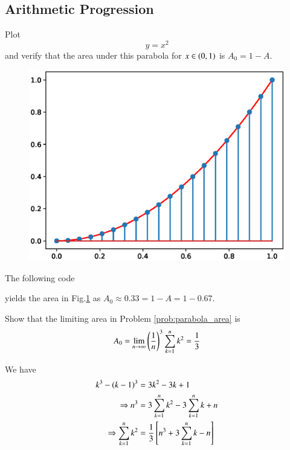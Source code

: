 \documentclass[journal,12pt,twocolumn]{IEEEtran}
\begin{document}
\subsection{Arithmetic Progression}
\begin{problem}
\label{prob:parabola_area}
Plot
\begin{equation}
\label{eq:parabola_area}
y = x^2
\end{equation}
%
and verify that the area under this parabola for $x \in \left(0,1\right)$ is $A_0=1-A$.
\end{problem}
%
\solution
\begin{figure}[!h]
\centering
\includegraphics[width=\columnwidth]{./figs/parabola_inverted_area.eps}
\caption{}
\label{fig:parabola_inverted_area}
\end{figure}
%
The following code
%

%
yields the area in Fig.\ref{fig:parabola_inverted_area} as $A_0\approx 0.33 = 1 - A = 1 - 0.67$.
\begin{problem}
Show that the limiting area in Problem \ref{prob:parabola_area} is
\begin{equation}
A_0 = \lim_{n\to \infty}\left(\frac{1}{n}\right)^3\sum_{k=1}^{n}k^2 = \frac{1}{3}
\end{equation}
\end{problem}
\solution 
%
We have
\begin{align}
k^3 - \left(k-1\right)^3 &= 3k^2-3k + 1
\\
\Rightarrow n^3  &= 3\sum_{k=1}^{n}k^2-3\sum_{k=1}^{n}k + n
\\
\Rightarrow \sum_{k=1}^{n}k^2 & = \frac{1}{3}{}\left[n^3 + 3\sum_{k=1}^{n}k - n\right]
\end{align}
\end{document}
